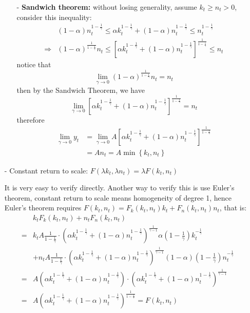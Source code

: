 \documentclass[10pt,landscape,a4paper]{article}
\begin{document}
\begin{multicols*}{4}
\begin{itemize}
\begin{itemize}
        \item[-] \textbf{Sandwich theorem:} without losing generality, assume $k_t\geq n_t>0$, consider this inequality:
        \begin{align*}
            & (1-\alpha)n_t^{1-\frac{1}{\gamma}} \leq \alpha k_t^{1-\frac{1}{\gamma}}+(1-\alpha)n_t^{1-\frac{1}{\gamma}} \leq n_t^{1-\frac{1}{\gamma}}\\
            \Rightarrow & (1-\alpha)^{\frac{1}{1-\frac{1}{\gamma}}}n_t \leq \left[\alpha k_t^{1-\frac{1}{\gamma}}+(1-\alpha)n_t^{1-\frac{1}{\gamma}}\right]^{\frac{1}{1-\frac{1}{\gamma}}} \leq n_t
        \end{align*}
        notice that $$ \lim_{\gamma\rightarrow 0}(1-\alpha)^{\frac{1}{1-\frac{1}{\gamma}}}n_t = n_t$$ then by the Sandwich Theorem, we have
        $$ \lim_{\gamma\rightarrow 0}\left[\alpha k_t^{1-\frac{1}{\gamma}}+(1-\alpha)n_t^{1-\frac{1}{\gamma}}\right]^{\frac{1}{1-\frac{1}{\gamma}}} =n_t$$
        therefore
        \begin{align*}
            \lim_{\gamma\rightarrow 0}y_t &= \lim_{\gamma\rightarrow 0}A\left[\alpha k_t^{1-\frac{1}{\gamma}}+(1-\alpha)n_t^{1-\frac{1}{\gamma}}\right]^{\frac{1}{1-\frac{1}{\gamma}}}\\
            & =A n_t = A\min\left\{k_t,n_t\right\}
        \end{align*}
    \end{itemize}
    
    \item[-] Constant return to scale: $F(\lambda k_t,\lambda n_t)=\lambda F(k_t,n_t)$
    
    It is very easy to verify directly. Another way to verify this is use Euler's theorem, constant return to scale means homogeneity of degree 1, hence Euler's theorem requires $F(k_t,n_t)=F_k(k_t,n_t)k_t+F_n(k_t,n_t)n_t$, that is:
    \begin{align*}
        & k_t F_k(k_t,n_t)+n_t F_n(k_t,n_t) \\
        =& k_t A \frac{1}{1-\frac{1}{\gamma}}\cdot \left(\alpha k_t^{1-\frac{1}{\gamma}}+(1-\alpha)n_t^{1-\frac{1}{\gamma}}\right)^{\frac{1}{\gamma-1}} \alpha\left(1-\frac{1}{\gamma}\right)k_t^{-\frac{1}{\gamma}}\\ &+n_t A \frac{1}{1-\frac{1}{\gamma}}\cdot \left(\alpha k_t^{1-\frac{1}{\gamma}}+(1-\alpha)n_t^{1-\frac{1}{\gamma}}\right)^{\frac{1}{\gamma-1}} (1-\alpha)\left(1-\frac{1}{\gamma}\right)n_t^{-\frac{1}{\gamma}}\\
        =& A\left( \alpha k_t^{1-\frac{1}{\gamma}}+(1-\alpha) n_t^{1-\frac{1}{\gamma}} \right)\cdot\left(\alpha k_t^{1-\frac{1}{\gamma}}+(1-\alpha)n_t^{1-\frac{1}{\gamma}}\right)^{\frac{1}{\gamma-1}}\\
        =& A\left(\alpha k_t^{1-\frac{1}{\gamma}}+(1-\alpha)n_t^{1-\frac{1}{\gamma}}\right)^{\frac{1}{1-\frac{1}{\gamma}}}= F(k_t,n_t)
    \end{align*}
    

\end{itemize}
\end{multicols*}
\end{document}
